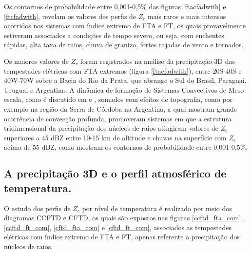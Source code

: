 
Os contornos de probabilidade entre 0,001-0,5\% das figuras \ref{ftacfadwith} e \ref{ftcfadwith}, revelam os valores dos perfis de $Z_c$ mais raros e mais intensos ocorridos nos sistemas com índice extremo de FTA e FT, os quais provavelmente estiveram associados a condições de tempo severo, ou seja, com enchentes rápidas, alta taxa de raios, chuva de granizo, fortes rajadas de vento e tornados. 

Os maiores valores de $Z_c$ foram registrados na análise da precipitação 3D das tempestades elétricas com FTA extremos (figura \ref{ftacfadwith}), entre 20S-40S e 40W-70W sobre a Bacia do Rio da Prata, que abrange o Sul do Brasil, Paraguai, Uruguai e Argentina. A dinâmica de formação de Sistemas Convectivos de Meso-escala, como é discutido em \cite{Velasco1987} e \cite{Durkee2009}, somados com efeitos de topografia, como por exemplo na região da Serra de Córdoba na Argentina, a qual \cite{Rasmussen2011} mostram grande ocorrência de convecção profunda, promoveram sistemas em que a estrutura tridimensional da precipitação dos núcleos de raios atingiram valores de $Z_c$ superiores a 45 dBZ entre 10-15 km de altitude e chuvas na superfície com $Z_c$ acima de 55 dBZ, como mostram os contornos de probabilidade entre 0,001-0,5\%.


\subsection{A precipitação 3D e o perfil atmosférico de temperatura.}

O estudo dos perfis de $Z_c$ por nível de temperatura é realizado por meio dos diagramas CCFTD e CFTD, os quais são expostos nas figuras \ref{ccftd_fta_com}, \ref{ccftd_ft_com}, \ref{cftd_fta_com} e \ref{cftd_ft_com}, associados as tempestades elétricas com índice extremo de FTA e FT, apenas referente a precipitação dos núcleos de raios.

